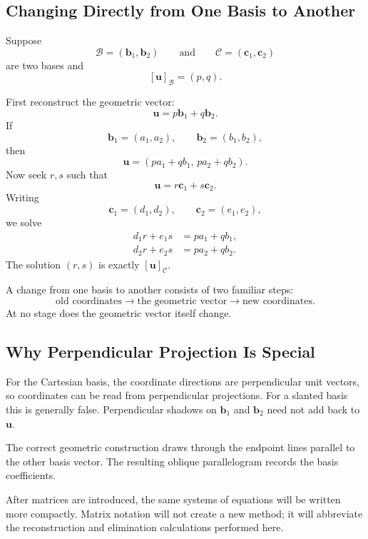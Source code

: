 \subsection{Changing Directly from One Basis to Another}

Suppose
\[
\mathcal B=(\mathbf b_1,\mathbf b_2)
\qquad\text{and}\qquad
\mathcal C=(\mathbf c_1,\mathbf c_2)
\]
are two bases and
\[
[\mathbf u]_{\mathcal B}=(p,q).
\]

\begin{derivationbox}
First reconstruct the geometric vector:
\[
\mathbf u=p\mathbf b_1+q\mathbf b_2.
\]
If
\[
\mathbf b_1=(a_1,a_2),
\qquad
\mathbf b_2=(b_1,b_2),
\]
then
\[
\mathbf u=(pa_1+qb_1,\,pa_2+qb_2).
\]
Now seek $r,s$ such that
\[
\mathbf u=r\mathbf c_1+s\mathbf c_2.
\]
Writing
\[
\mathbf c_1=(d_1,d_2),
\qquad
\mathbf c_2=(e_1,e_2),
\]
we solve
\[
\begin{aligned}
 d_1r+e_1s&=pa_1+qb_1,\\
 d_2r+e_2s&=pa_2+qb_2.
\end{aligned}
\]
The solution $(r,s)$ is exactly $[\mathbf u]_{\mathcal C}$.
\end{derivationbox}

\begin{corebox}
A change from one basis to another consists of two familiar steps:
\[
\boxed{
\text{old coordinates}
\longrightarrow
\text{the geometric vector}
\longrightarrow
\text{new coordinates}.}
\]
At no stage does the geometric vector itself change.
\end{corebox}

\subsection{Why Perpendicular Projection Is Special}

\begin{interpretationbox}
For the Cartesian basis, the coordinate directions are perpendicular unit
vectors, so coordinates can be read from perpendicular projections. For a
slanted basis this is generally false. Perpendicular shadows on
$\mathbf b_1$ and $\mathbf b_2$ need not add back to $\mathbf u$.

The correct geometric construction draws through the endpoint lines parallel to
the other basis vector. The resulting oblique parallelogram records the basis
coefficients.
\end{interpretationbox}

\begin{remarkbox}
After matrices are introduced, the same systems of equations will be written
more compactly. Matrix notation will not create a new method; it will abbreviate
the reconstruction and elimination calculations performed here.
\end{remarkbox}
